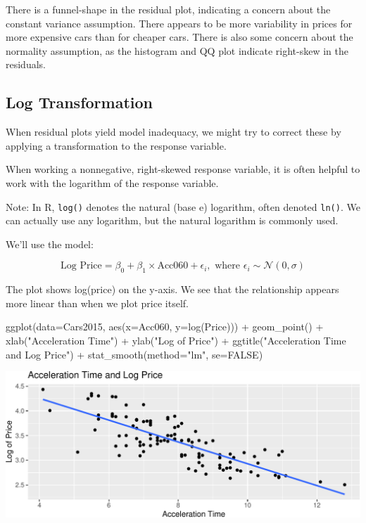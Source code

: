 \documentclass[
  letterpaper,
  DIV=11,
  numbers=noendperiod]{scrreprt}
\newenvironment{Shaded}{\begin{snugshade}}{\end{snugshade}}
\newcommand{\AttributeTok}[1]{\textcolor[rgb]{0.40,0.45,0.13}{#1}}
\newcommand{\ConstantTok}[1]{\textcolor[rgb]{0.56,0.35,0.01}{#1}}
\newcommand{\FunctionTok}[1]{\textcolor[rgb]{0.28,0.35,0.67}{#1}}
\newcommand{\NormalTok}[1]{\textcolor[rgb]{0.00,0.23,0.31}{#1}}
\newcommand{\SpecialCharTok}[1]{\textcolor[rgb]{0.37,0.37,0.37}{#1}}
\newcommand{\StringTok}[1]{\textcolor[rgb]{0.13,0.47,0.30}{#1}}
\begin{document}
There is a funnel-shape in the residual plot, indicating a concern about
the constant variance assumption. There appears to be more variability
in prices for more expensive cars than for cheaper cars. There is also
some concern about the normality assumption, as the histogram and QQ
plot indicate right-skew in the residuals.

\subsection{Log Transformation}\label{log-transformation}

When residual plots yield model inadequacy, we might try to correct
these by applying a transformation to the response variable.

When working a nonnegative, right-skewed response variable, it is often
helpful to work with the logarithm of the response variable.

Note: In R, \texttt{log()} denotes the natural (base e) logarithm, often
denoted \texttt{ln()}. We can actually use any logarithm, but the
natural logarithm is commonly used.

We'll use the model:

\[
\text{Log Price} = \beta_0 + \beta_1\times \text{Acc060} + \epsilon_i , \text{ where } \epsilon_i\sim\mathcal{N}(0, \sigma)
\]

The plot shows log(price) on the y-axis. We see that the relationship
appears more linear than when we plot price itself.

\begin{Shaded}
\begin{Highlighting}[]
\FunctionTok{ggplot}\NormalTok{(}\AttributeTok{data=}\NormalTok{Cars2015, }\FunctionTok{aes}\NormalTok{(}\AttributeTok{x=}\NormalTok{Acc060, }\AttributeTok{y=}\FunctionTok{log}\NormalTok{(Price))) }\SpecialCharTok{+} \FunctionTok{geom\_point}\NormalTok{() }\SpecialCharTok{+} 
  \FunctionTok{xlab}\NormalTok{(}\StringTok{"Acceleration Time"}\NormalTok{) }\SpecialCharTok{+} \FunctionTok{ylab}\NormalTok{(}\StringTok{"Log of Price"}\NormalTok{) }\SpecialCharTok{+} 
  \FunctionTok{ggtitle}\NormalTok{(}\StringTok{"Acceleration Time and Log Price"}\NormalTok{) }\SpecialCharTok{+} \FunctionTok{stat\_smooth}\NormalTok{(}\AttributeTok{method=}\StringTok{"lm"}\NormalTok{, }\AttributeTok{se=}\ConstantTok{FALSE}\NormalTok{)}
\end{Highlighting}
\end{Shaded}

\includegraphics{Ch5_files/figure-pdf/unnamed-chunk-13-1.pdf}
\end{document}
